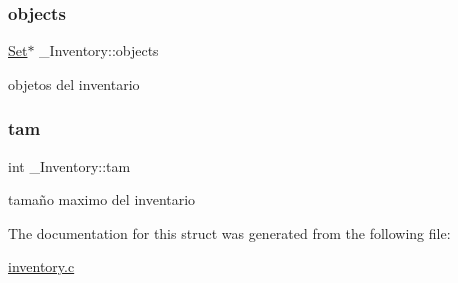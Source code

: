 \subsubsection{\texorpdfstring{objects}{objects}}
{\footnotesize\ttfamily \hyperlink{set_8h_a6d3b7f7c92cbb4577ef3ef7ddbf93161}{Set}$\ast$ \+\_\+\+Inventory\+::objects}

objetos del inventario \mbox{\label{struct__Inventory_ae6dad9356e59d5e9ce48b09861be1516}} 
\subsubsection{\texorpdfstring{tam}{tam}}
{\footnotesize\ttfamily int \+\_\+\+Inventory\+::tam}

tamaño maximo del inventario 

The documentation for this struct was generated from the following file\+:\begin{DoxyCompactItemize}
\item 
\hyperlink{inventory_8c}{inventory.\+c}\end{DoxyCompactItemize}
